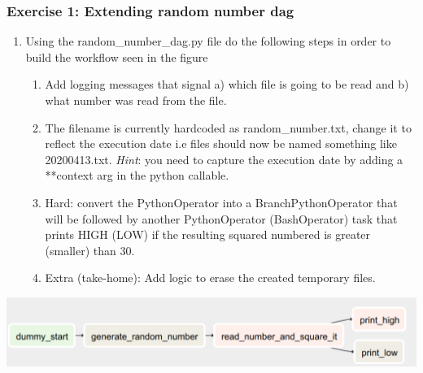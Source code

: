 \documentclass[leqno, 10pt, envcountsect]{beamer}
\numberwithin{equation}{section}
\theoremstyle{definition}
\theoremstyle{example}
\numberwithin{figure}{section}
\numberwithin{table}{section}
\let\olditem\item
\renewcommand{\item}{%
\olditem\vspace{1pt}}
\begin{document}
\begin{frame}[fragile=singleslide]
  \frametitle{Exercise 1: Extending random number dag}
  \begin{enumerate}
    \item Using the random_number_dag.py file do the following steps in order
      to build the workflow seen in the figure
    \begin{enumerate}
      \item Add logging messages that signal a) which file is going to be read and b) what number was read from the file.
      \item The filename is currently hardcoded as random_number.txt, change it
        to reflect the execution date i.e files should now be named something
        like 20200413.txt. \textit{Hint}: you need to capture the execution date by
        adding a **context arg in the python callable.
      \item Hard: convert the PythonOperator into a BranchPythonOperator that will be followed by another PythonOperator (BashOperator) task that prints HIGH (LOW) if the resulting squared numbered is greater (smaller) than 30.
      \item Extra (take-home): Add logic to erase the created temporary files.
    \end{enumerate}
  \end{enumerate}
  \begin{center}
    \includegraphics[scale=0.1]{exercise_1.png}
  \end{center}
\end{frame}
\end{document}

